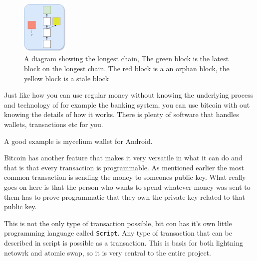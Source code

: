 \begin{figure}[H]
	\centering
	\includegraphics[width=0.2\textwidth]{introduction/images/more_blockchain.png}
	\caption{A diagram showing the longest chain, The green block is the latest
	block on the longest chain. The red block is a an orphan block, the yellow
	block is a stale block}
	\label{fig:blockchain2}
\end{figure}


Just like how you can use regular money without knowing the underlying process
and technology of for example the banking system, you can use bitcoin with out
knowing the details of how it works. There is plenty of software that handles
wallets, transactions etc for you.

A good example is mycelium wallet for Android.

Bitcoin has another feature that makes it very versatile in what it can do and
that is that every transaction is programmable. As mentioned earlier the most
common transaction is sending the money to someones public key. What really
goes on here is that the person who wants to spend whatever money was sent to
them has to prove programmatic that they own the private key related to that
public key.

This is not the only type of transaction possible, bit con has it's own little
programming language called \texttt{Script}. Any type of transaction that can
be described in script is possible as a transaction. This is basis for both
lightning netowrk and atomic swap, so it is very central to the entire project.
